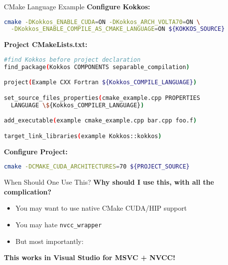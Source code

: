 \begin{frame}[fragile]{CMake Language Example}
\textbf{Configure Kokkos:}
\begin{lstlisting}[language=bash]
cmake -DKokkos_ENABLE_CUDA=ON -DKokkos_ARCH_VOLTA70=ON \
  -DKokkos_ENABLE_COMPILE_AS_CMAKE_LANGUAGE=ON ${KOKKOS_SOURCE}
\end{lstlisting}

\textbf{Project CMakeLists.txt:}
\begin{lstlisting}[language=bash]
#find Kokkos before project declaration
find_package(Kokkos COMPONENTS separable_compilation)

project(Example CXX Fortran ${Kokkos_COMPILE_LANGUAGE})

set_source_files_properties(cmake_example.cpp PROPERTIES 
  LANGUAGE \${Kokkos_COMPILER_LANGUAGE})

add_executable(example cmake_example.cpp bar.cpp foo.f)

target_link_libraries(example Kokkos::kokkos)
\end{lstlisting}

\textbf{Configure Project:}

\begin{lstlisting}[language=bash]
cmake -DCMAKE_CUDA_ARCHITECTURES=70 ${PROJECT_SOURCE}
\end{lstlisting}

\end{frame}

\begin{frame}[fragile]{When Should One Use This?}
\textbf{Why should I use this, with all the complication?}
\begin{itemize}
  \item{You may want to use native CMake CUDA/HIP support}
  \item{You may hate \texttt{nvcc\_wrapper}}
  \item{But most importantly:}
\end{itemize}

\begin{center}
\textbf{This works in Visual Studio for MSVC + NVCC!}
\end{center}

\end{frame}
%

